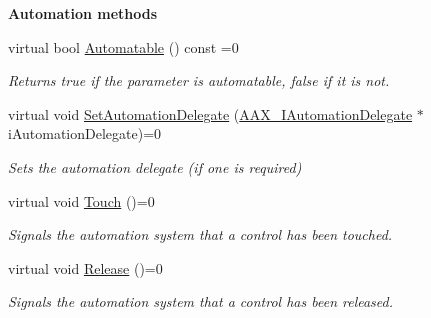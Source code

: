 \begin{Indent}\textbf{ Automation methods}\par
\begin{DoxyCompactItemize}
\item 
virtual bool \mbox{\hyperlink{a01857_a253ff336b79cfb454f07d4fa21f2884f}{Automatable}} () const =0
\begin{DoxyCompactList}\small\item\em Returns true if the parameter is automatable, false if it is not. \end{DoxyCompactList}\item 
virtual void \mbox{\hyperlink{a01857_a2c3dfdce09a2652f954ea6e4f9e12797}{Set\+Automation\+Delegate}} (\mbox{\hyperlink{a01773}{A\+A\+X\+\_\+\+I\+Automation\+Delegate}} $\ast$i\+Automation\+Delegate)=0
\begin{DoxyCompactList}\small\item\em Sets the automation delegate (if one is required) \end{DoxyCompactList}\item 
virtual void \mbox{\hyperlink{a01857_a74c71243313f9d817c8bcb77550969aa}{Touch}} ()=0
\begin{DoxyCompactList}\small\item\em Signals the automation system that a control has been touched. \end{DoxyCompactList}\item 
virtual void \mbox{\hyperlink{a01857_a3d4869d9b6ec03d4f95f33f56479756f}{Release}} ()=0
\begin{DoxyCompactList}\small\item\em Signals the automation system that a control has been released. \end{DoxyCompactList}\end{DoxyCompactItemize}
\end{Indent}
